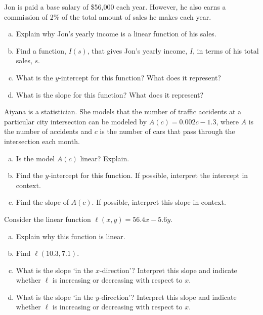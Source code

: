 \documentclass[11pt,letterpaper]{article}
\begin{document}
\newpage



 Jon is paid a base salary of \$56,000 each year. However, he also earns a commission of 2\% of the total amount of sales he makes each year. 
        \begin{enumerate}[(a)]
        \item Explain why Jon's yearly income is a linear function of his sales.
        \item Find a function, $I(s)$, that gives Jon's yearly income, $I$, in terms of his total sales, $s$.
        \item What is the $y$-intercept for this function? What does it represent?
        \item What is the slope for this function? What does it represent? 
        \end{enumerate}



\newpage



 Aiyana is a statistician. She models that the number of traffic accidents at a particular city intersection can be modeled by $A(c)= 0.002c - 1.3$, where $A$ is the number of accidents and $c$ is the number of cars that pass through the intersection each month. 
	\begin{enumerate}[(a)]
	\item Is the model $A(c)$ linear? Explain.
	\item Find the $y$-intercept for this function. If possible, interpret the intercept in context. 
	\item Find the slope of $A(c)$. If possible, interpret this slope in context. 
	\end{enumerate}



\newpage



 Consider the linear function $\ell(x, y)= 56.4x - 5.6y$. 
\begin{enumerate}[(a)]
\item Explain why this function is linear. 
\item Find $\ell(10.3, 7.1)$.
\item What is the slope `in the $x$-direction'? Interpret this slope and indicate whether $\ell$ is increasing or decreasing with respect to $x$. 
\item What is the slope `in the $y$-direction'? Interpret this slope and indicate whether $\ell$ is increasing or decreasing with respect to $x$. 
\end{enumerate}
\end{document}
